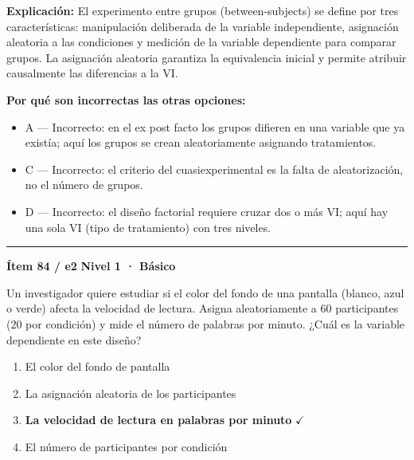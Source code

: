 \documentclass[12pt,a4paper]{article}
\begin{document}
\noindent\textbf{\color{azul}Explicación:} El experimento entre grupos (between-subjects) se define por tres características: manipulación deliberada de la variable independiente, asignación aleatoria a las condiciones y medición de la variable dependiente para comparar grupos. La asignación aleatoria garantiza la equivalencia inicial y permite atribuir causalmente las diferencias a la VI.

\noindent\textbf{\color{gris}Por qué son incorrectas las otras opciones:}
\begin{itemize}
  \item {\small A — Incorrecto: en el ex post facto los grupos difieren en una variable que ya existía; aquí los grupos se crean aleatoriamente asignando tratamientos.}
  \item {\small C — Incorrecto: el criterio del cuasiexperimental es la falta de aleatorización, no el número de grupos.}
  \item {\small D — Incorrecto: el diseño factorial requiere cruzar dos o más VI; aquí hay una sola VI (tipo de tratamiento) con tres niveles.}
\end{itemize}
\vspace{8pt}\hrule\vspace{10pt}

\begin{mdframed}[backgroundcolor=fondogris,linecolor=azul,linewidth=1pt,innerleftmargin=10pt,innerrightmargin=10pt,innertopmargin=7pt,innerbottommargin=7pt]
\textbf{Ítem 84 / e2} \hfill {\small\bfseries\color{azul} Nivel 1 · Básico}
\end{mdframed}

Un investigador quiere estudiar si el color del fondo de una pantalla (blanco, azul o verde) afecta la velocidad de lectura. Asigna aleatoriamente a 60 participantes (20 por condición) y mide el número de palabras por minuto. ¿Cuál es la variable dependiente en este diseño?

\begin{enumerate}
  \item[A.] El color del fondo de pantalla
  \item[B.] La asignación aleatoria de los participantes
  \item[\textbf{\color{verde}C.}] \textbf{\color{verde} La velocidad de lectura en palabras por minuto} \hfill $\checkmark$
  \item[D.] El número de participantes por condición
\end{enumerate}
\end{document}
